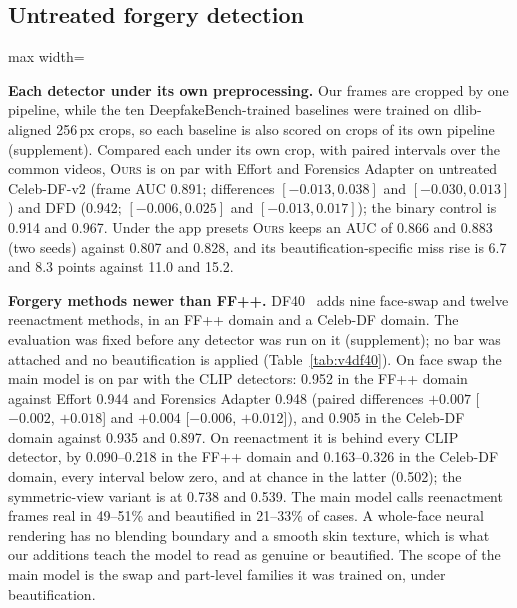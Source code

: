 \documentclass[conference]{IEEEtran}
\newcommand{\ours}{\textsc{Ours}}
\begin{document}
\subsection{Untreated forgery detection}
\label{sec:detect}
\begin{table}[t]
\centering
\caption{DF40 held-out, untreated: video AUC, mean over nine face-swap (FS) and twelve reenactment (FR) methods, against
the same-domain real videos. Intervals, every detector and every arm in the supplement.}
\label{tab:v4df40}
\footnotesize
\setlength{\tabcolsep}{3pt}
\begin{adjustbox}{max width=\columnwidth}\end{adjustbox}
\end{table}
\textbf{Each detector under its own preprocessing.} Our frames are cropped by one pipeline, while the ten
DeepfakeBench-trained baselines were trained on dlib-aligned 256\,px crops, so each baseline is also scored on crops of
its own pipeline (supplement). Compared each under its own crop, with paired intervals over the common videos, \ours{}
is on par with Effort and Forensics Adapter on untreated Celeb-DF-v2 (frame AUC 0.891; differences $[-0.013, 0.038]$
and $[-0.030, 0.013]$) and DFD (0.942; $[-0.006, 0.025]$ and $[-0.013, 0.017]$); the binary control is 0.914 and 0.967.
Under the app presets \ours{} keeps an AUC of 0.866 and 0.883 (two seeds) against 0.807 and 0.828, and its
beautification-specific miss rise is 6.7 and 8.3 points against 11.0 and 15.2.

\textbf{Forgery methods newer than FF++.}\label{sec:df40} DF40~\cite{df40} adds nine face-swap and twelve reenactment
methods, in an FF++ domain and a Celeb-DF domain. The evaluation was fixed before any
detector was run on it (supplement); no bar was attached and no beautification is applied
(Table~\ref{tab:v4df40}). On face swap the main model is on par with the CLIP detectors: 0.952 in the
FF++ domain against Effort 0.944 and Forensics Adapter 0.948 (paired differences $+0.007$ [$-0.002$, $+0.018$] and
$+0.004$ [$-0.006$, $+0.012$]), and 0.905 in the Celeb-DF domain against 0.935 and 0.897. On reenactment it is behind
every CLIP detector, by 0.090--0.218 in the FF++ domain and 0.163--0.326 in the Celeb-DF domain, every interval below
zero, and at chance in the latter (0.502); the symmetric-view variant is at 0.738 and 0.539. The main model calls
reenactment frames real in 49--51\% and beautified in 21--33\% of cases. A whole-face neural rendering has no blending
boundary and a smooth skin texture, which is what our additions teach the model to read as genuine or beautified. The
scope of the main model is the swap and part-level families it was trained on, under beautification.
\end{document}
